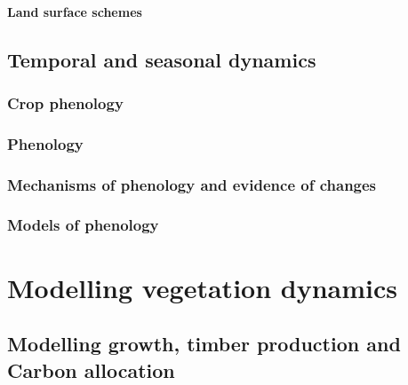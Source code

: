 \documentclass[
  oneside]{book}
\begin{document}
\hypertarget{land-surface-schemes}{%
\subsection{Land surface schemes}\label{land-surface-schemes}}

\hypertarget{temporal-and-seasonal-dynamics}{%
\chapter{Temporal and seasonal dynamics}\label{temporal-and-seasonal-dynamics}}


\hypertarget{crop-phenology}{%
\section{Crop phenology}\label{crop-phenology}}

\hypertarget{phenology}{%
\section{Phenology}\label{phenology}}

\hypertarget{mechanisms-of-phenology-and-evidence-of-changes}{%
\section{Mechanisms of phenology and evidence of changes}\label{mechanisms-of-phenology-and-evidence-of-changes}}

\hypertarget{models-of-phenology}{%
\section{Models of phenology}\label{models-of-phenology}}

\hypertarget{part-modelling-vegetation-dynamics}{%
\part{Modelling vegetation dynamics}\label{part-modelling-vegetation-dynamics}}

\hypertarget{modelling-growth-timber-production-and-carbon-allocation}{%
\chapter{Modelling growth, timber production and Carbon allocation}\label{modelling-growth-timber-production-and-carbon-allocation}}
\end{document}

